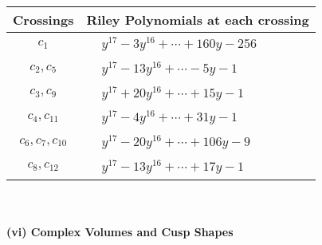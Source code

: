 \documentclass[1p]{elsarticle_modified}
\theoremstyle{definition}
\begin{document}
\begin{tabular}{m{50pt}|m{274pt}}
Crossings & \hspace{64pt}Riley Polynomials at each crossing \\
\hline $$\begin{aligned}c_{1}\end{aligned}$$&$\begin{aligned}
&y^{17}-3 y^{16}+\cdots+160 y-256
\end{aligned}$\\
\hline $$\begin{aligned}c_{2},c_{5}\end{aligned}$$&$\begin{aligned}
&y^{17}-13 y^{16}+\cdots-5 y-1
\end{aligned}$\\
\hline $$\begin{aligned}c_{3},c_{9}\end{aligned}$$&$\begin{aligned}
&y^{17}+20 y^{16}+\cdots+15 y-1
\end{aligned}$\\
\hline $$\begin{aligned}c_{4},c_{11}\end{aligned}$$&$\begin{aligned}
&y^{17}-4 y^{16}+\cdots+31 y-1
\end{aligned}$\\
\hline $$\begin{aligned}c_{6},c_{7},c_{10}\end{aligned}$$&$\begin{aligned}
&y^{17}-20 y^{16}+\cdots+106 y-9
\end{aligned}$\\
\hline $$\begin{aligned}c_{8},c_{12}\end{aligned}$$&$\begin{aligned}
&y^{17}-13 y^{16}+\cdots+17 y-1
\end{aligned}$\\
\hline
\end{tabular}\\~\\
\newpage\flushleft \textbf{(vi) Complex Volumes and Cusp Shapes}
\end{document}
